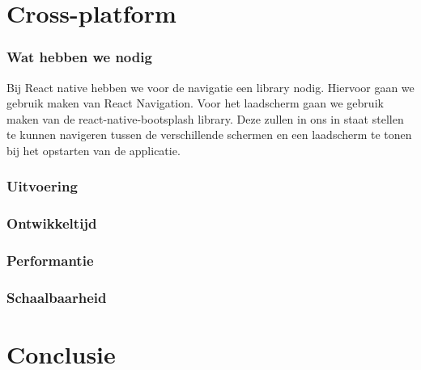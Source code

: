 


\section{Cross-platform}
\subsubsection{Wat hebben we nodig}
Bij React native hebben we voor de navigatie een library nodig. Hiervoor gaan we gebruik maken van
React Navigation. Voor het laadscherm gaan we gebruik maken van de react-native-bootsplash library. 
Deze zullen in ons in staat stellen te kunnen navigeren tussen de verschillende schermen en een
laadscherm te tonen bij het opstarten van de applicatie.

\subsubsection{Uitvoering}



\subsubsection{Ontwikkeltijd}



\subsubsection{Performantie}



\subsubsection{Schaalbaarheid}




\section{Conclusie}


